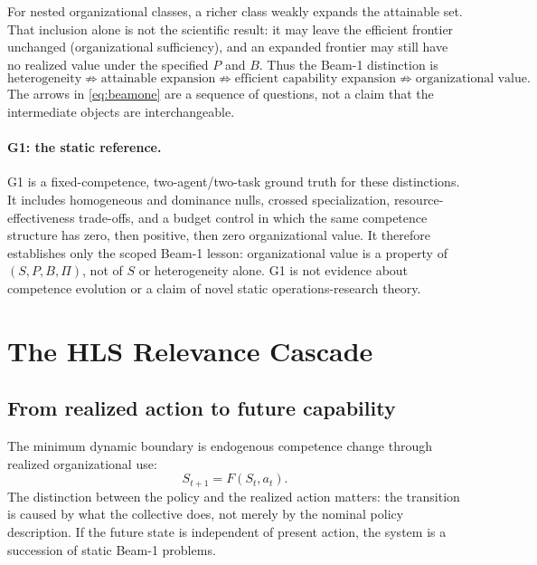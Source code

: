 \documentclass[10pt]{article}
\begin{document}
For nested organizational classes, a richer class weakly expands the attainable
set. That inclusion alone is not the scientific result: it may leave the
efficient frontier unchanged (organizational sufficiency), and an expanded
frontier may still have no realized value under the specified $P$ and $B$.
Thus the Beam-1 distinction is
\begin{equation}
\text{heterogeneity}
\not\Rightarrow \text{attainable expansion}
\not\Rightarrow \text{efficient capability expansion}
\not\Rightarrow \text{organizational value}.
\label{eq:beamone}
\end{equation}
The arrows in \eqref{eq:beamone} are a sequence of questions, not a claim that
the intermediate objects are interchangeable.

\paragraph{G1: the static reference.}
G1 is a fixed-competence, two-agent/two-task ground truth for these
distinctions. It includes homogeneous and dominance nulls, crossed
specialization, resource-effectiveness trade-offs, and a budget control in
which the same competence structure has zero, then positive, then zero
organizational value. It therefore establishes only the scoped Beam-1 lesson:
organizational value is a property of $(S,P,B,\Pi)$, not of $S$ or
heterogeneity alone. G1 is not evidence about competence evolution or a claim
of novel static operations-research theory.

\section{The HLS Relevance Cascade}

\subsection{From realized action to future capability}

The minimum dynamic boundary is endogenous competence change through realized
organizational use:
\begin{equation}
S_{t+1}=F(S_t,a_t).
\label{eq:transition}
\end{equation}
The distinction between the policy and the realized action matters: the
transition is caused by what the collective does, not merely by the nominal
policy description. If the future state is independent of present action, the
system is a succession of static Beam-1 problems.
\end{document}
